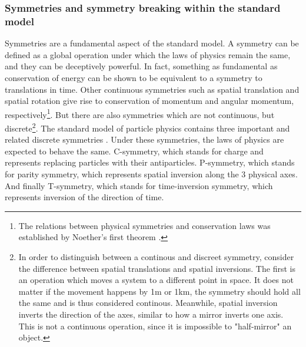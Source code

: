 \subsubsection{Symmetries and symmetry breaking within the standard model}\label{sec:IntroSymmetries}
Symmetries are a fundamental aspect of the standard model. A symmetry can be defined as a global operation under which the laws of physics remain the same, and they can be deceptively powerful. In fact, something as fundamental as conservation of energy can be shown to be equivalent to a symmetry to translations in time. Other continuous symmetries such as spatial translation and spatial rotation give rise to conservation of momentum and angular momentum, respectively\footnote{The relations between physical symmetries and conservation laws was established by Noether's first theorem \cite{Noether1918}. }. But there are also symmetries which are not continuous, but discrete\footnote{In order to distinguish between a continous and discreet symmetry, consider the difference between spatial translations and spatial inversions. The first is an operation which moves a system to a different point in space. It does not matter if the movement happens by 1m or 1km, the symmetry should hold all the same and is thus considered continous. Meanwhile, spatial inversion inverts the direction of the axes, similar to how a mirror inverts one axis. This is not a continuous operation, since it is impossible to "half-mirror" an object.}. The standard model of particle physics contains three important and related discrete symmetries \cite{Physics_from_symmetry}. Under these symmetries, the laws of physics are expected to behave the same. C-symmetry, which stands for charge and represents replacing particles with their antiparticles. P-symmetry, which stands for parity symmetry, which represents spatial inversion along the 3 physical axes. And finally T-symmetry, which stands for time-inversion symmetry, which represents inversion of the direction of time. \\

